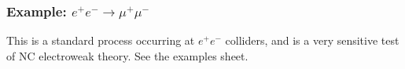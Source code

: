 \subsubsection{Example: $e^+ e^- \to \mu^+ \mu^-$}
%
\begin{figure}[!h]
  \centering
  \hfill
\end{figure}
This is a standard process occurring at $e^+ e^-$ colliders, and is a very sensitive test of NC electroweak theory. See the examples sheet.
%
